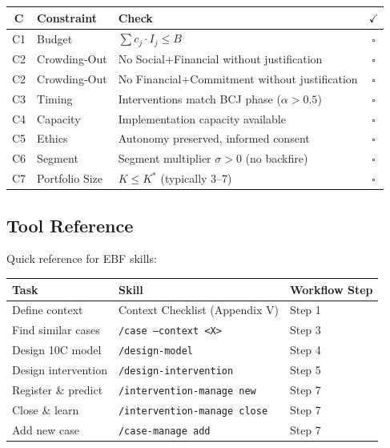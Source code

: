 \begin{tcolorbox}[colback=red!5!white,colframe=red!75!black,
    title=\textbf{Portfolio Validation Checklist (C1--C7)}]
\small
\begin{tabular}{|c|l|l|c|}
\hline
\textbf{C} & \textbf{Constraint} & \textbf{Check} & $\checkmark$ \\
\hline
C1 & Budget & $\sum c_j \cdot I_j \leq B$ & $\square$ \\
C2 & Crowding-Out & No Social+Financial without justification & $\square$ \\
C2 & Crowding-Out & No Financial+Commitment without justification & $\square$ \\
C3 & Timing & Interventions match BCJ phase ($\alpha > 0.5$) & $\square$ \\
C4 & Capacity & Implementation capacity available & $\square$ \\
C5 & Ethics & Autonomy preserved, informed consent & $\square$ \\
C6 & Segment & Segment multiplier $\sigma > 0$ (no backfire) & $\square$ \\
C7 & Portfolio Size & $K \leq K^*$ (typically 3--7) & $\square$ \\
\hline
\end{tabular}
\end{tcolorbox}

\subsection{Tool Reference}
\label{sec:25-tools}

Quick reference for EBF skills:

\begin{center}
\begin{tabular}{|l|l|l|}
\hline
\textbf{Task} & \textbf{Skill} & \textbf{Workflow Step} \\
\hline
Define context & Context Checklist (Appendix V) & Step 1 \\
Find similar cases & \texttt{/case --context <X>} & Step 3 \\
Design 10C model & \texttt{/design-model} & Step 4 \\
Design intervention & \texttt{/design-intervention} & Step 5 \\
Register \& predict & \texttt{/intervention-manage new} & Step 7 \\
Close \& learn & \texttt{/intervention-manage close} & Step 7 \\
Add new case & \texttt{/case-manage add} & Step 7 \\
\hline
\end{tabular}
\end{center}


